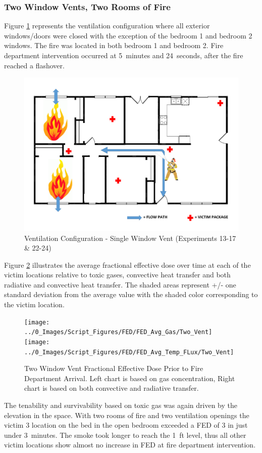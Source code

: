 \documentclass[12pt,oneside]{book}
\begin{document}
\subsubsection{Two Window Vents, Two Rooms of Fire}

Figure \ref{fig:Vent_Profile-Two_Vent} represents the ventilation configuration where all exterior windows/doors were closed with the exception of the bedroom 1 and bedroom 2 windows. The fire was located in both bedroom 1 and bedroom 2. Fire department intervention occurred at 5~minutes and 24~seconds, after the fire reached a flashover. 

\begin{figure}[H]
	\centering
	\includegraphics[width=.65\textwidth]{Figures/General/2vent2fire.png}
	\caption{Ventilation Configuration - Single Window Vent (Experiments 13-17 \& 22-24)}
	\label{fig:Vent_Profile-Two_Vent}
\end{figure}

Figure \ref{fig:FED_TwoVent} illustrates the average fractional effective dose over time at each of the victim locations relative to toxic gases, convective heat transfer and both radiative and convective heat transfer. The shaded areas represent +/- one standard deviation from the average value with the shaded color corresponding to the victim location. 

\begin{figure}[H]
	\centering
	\texttt{[image: ../0\_Images/Script\_Figures/FED/FED\_Avg\_Gas/Two\_Vent]}
	\texttt{[image: ../0\_Images/Script\_Figures/FED/FED\_Avg\_Temp\_FLux/Two\_Vent]}
	\caption[Two Window Vent Fractional Effective Dose]{Two Window Vent Fractional Effective Dose Prior to Fire Department Arrival. Left chart is based on gas concentration, Right chart is based on both convective and radiative transfer.}
	\label{fig:FED_TwoVent}
\end{figure}

The tenability and survivability based on toxic gas was again driven by the elevation in the space. With two rooms of fire and two ventilation openings the victim 3 location on the bed in the open bedroom exceeded a FED of 3 in just under 3~minutes. The smoke took longer to reach the 1~ft level, thus all other victim locations show almost no increase in FED at fire department intervention.
\end{document}
